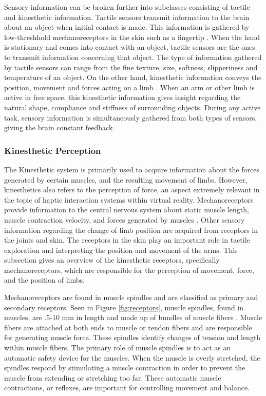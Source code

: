  \par Sensory information can be broken further into subclasses consisting of tactile and kinesthetic information. Tactile sensors transmit information to the brain about an object when initial contact is made. This information is gathered by low-threshhold mechanoreceptors  in the skin such as a fingertip \cite{mihelj_haptics}. When the hand is stationary and comes into contact with an object, tactile sensors are the ones to transmit information concerning that object. The type of information gathered by tactile sensors can range from the fine texture, size, softness, slipperiness and temperature of an object. On the other hand, kinesthetic information conveys the position, movement and forces acting on a limb \cite{mihelj_haptics}. When an arm or other limb is active in free space, this kinesthetic information gives insight regarding the natural shape, compliance and stiffness of surrounding objects. During any active task, sensory information is simultaneously gathered from both types of sensors, giving the brain constant feedback.
 
 \subsubsection{Kinesthetic Perception} \label{tactile_kinesthetic}
 
 The Kinesthetic system is primarily used to acquire information about the forces generated by certain muscles, and the resulting movement of limbs. However, kinesthetics also refers to the perception of force, an aspect extremely relevant in the topic of haptic interaction systems within virtual reality. Mechanoreceptors provide information to the central nervous system about static muscle length, muscle contraction velocity, and forces generated by muscles \cite{mihelj_haptics}. Other sensory information regarding the change of limb position are acquired from receptors in the joints and skin. The receptors in the skin play an important role in tactile exploration and interpreting the position and movement of the arms. This subsection gives an overview of the kinesthetic receptors, specifically mechanoreceptors, which are responsible for the perception of movement, force, and the position of limbs.
 
 \par  Mechanoreceptors are found in muscle spindles and are classified as primary and secondary receptors. Seen in Figure \ref{fig:receptors}, muscle spindles, found in muscles, are .5-10 mm in length and made up of bundles of muscle fibers \cite{mihelj_haptics}. Muscle fibers are attached at both ends to muscle or tendon fibers and are responsible for generating muscle force. These spindles identify changes of tension and length within muscle fibers. The primary role of muscle spindles is to act as an automatic safety device for the muscles. When the muscle is overly stretched, the spindles respond by stimulating a muscle contraction in order to prevent the muscle from extending or stretching too far. These automatic muscle contractions, or reflexes, are important for controlling movement and balance.
 
